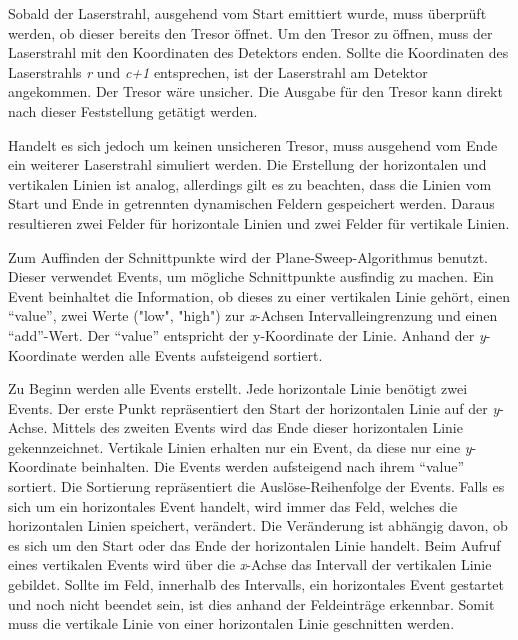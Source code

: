 Sobald der Laserstrahl, ausgehend vom Start emittiert wurde, muss überprüft werden, ob dieser bereits den Tresor öffnet. Um den Tresor zu öffnen, muss der Laserstrahl mit den Koordinaten des Detektors enden. Sollte die Koordinaten des Laserstrahls \textit{r} und \textit{c+1} entsprechen, ist der Laserstrahl am Detektor angekommen. Der Tresor wäre unsicher. Die Ausgabe für den Tresor kann direkt nach dieser Feststellung getätigt werden.

Handelt es sich jedoch um keinen unsicheren Tresor, muss ausgehend vom Ende ein weiterer Laserstrahl simuliert werden. Die Erstellung der horizontalen und vertikalen Linien ist analog, allerdings gilt es zu beachten, dass die Linien vom Start und Ende in getrennten dynamischen Feldern gespeichert werden. Daraus resultieren zwei Felder für horizontale Linien und zwei Felder für vertikale Linien.

Zum Auffinden der Schnittpunkte wird der Plane-Sweep-Algorithmus benutzt. Dieser verwendet Events, um mögliche Schnittpunkte ausfindig zu machen. Ein Event beinhaltet die Information, ob dieses zu einer vertikalen Linie gehört, einen “value”, zwei Werte ("low", "high") zur \textit{x}-Achsen Intervalleingrenzung und einen “add”-Wert. Der “value” entspricht der y-Koordinate der Linie. Anhand der \textit{y}-Koordinate werden alle Events aufsteigend sortiert. 

Zu Beginn werden alle Events erstellt. Jede horizontale Linie benötigt zwei Events. Der erste Punkt repräsentiert den Start der horizontalen Linie auf der \textit{y}-Achse. Mittels des zweiten Events wird das Ende dieser horizontalen Linie gekennzeichnet. Vertikale Linien erhalten nur ein Event, da diese nur eine \textit{y}-Koordinate beinhalten. Die Events werden aufsteigend nach ihrem “value” sortiert. Die Sortierung repräsentiert die Auslöse-Reihenfolge der Events. Falls es sich um ein horizontales Event handelt, wird immer das Feld, welches die horizontalen Linien speichert, verändert. Die Veränderung ist abhängig davon, ob es sich um den Start oder das Ende der horizontalen Linie handelt. Beim Aufruf eines vertikalen Events wird über die \textit{x}-Achse das Intervall der vertikalen Linie gebildet. Sollte im Feld, innerhalb des Intervalls, ein horizontales Event gestartet und noch nicht beendet sein, ist dies anhand der Feldeinträge erkennbar. Somit muss die vertikale Linie von einer horizontalen Linie geschnitten werden.

